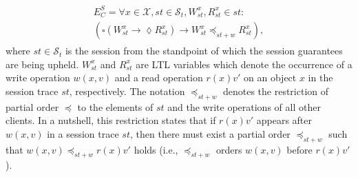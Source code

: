 \documentclass[journal, compsoc]{IEEEtran}
\begin{document}
	\begin{align}\label{eqn:RYW}
	\begin{split}
	E^S_C =  \forall x \in \mathcal{X}, \mathit{st} \in  \mathcal{S}_t, W_\mathit{st}^x, R_\mathit{st}^x \in \mathit{st}:
	\\ \left( \square \left( W_\mathit{st}^x \rightarrow \lozenge R_\mathit{st}^x \right)
	\rightarrow  W_\mathit{st}^x  \preccurlyeq_{\mathit{st}+w} R_\mathit{st}^x \right),
	\end{split}
	\end{align} where $\mathit{st}\in \mathcal{S}_t$ is the session from the standpoint of which the session guarantees are being upheld.
	$W_\mathit{st}^x$ and $R_\mathit{st}^x$ are LTL variables which denote the occurrence of a write operation $w(x,v)$ and a read operation $r(x){v'}$ on an object $x$ in the session trace $\mathit{st}$, respectively.
	The notation $\preccurlyeq_{\mathit{st}+w}$ denotes the restriction of partial order $\preccurlyeq$ to the elements of $\mathit{st}$ and the write operations of all other clients. %
	In a nutshell, this restriction states that if $r(x){v'}$ %
	appears after $w(x,v)$ in a session trace $\mathit{st}$, %
	then there must exist a partial order $\preccurlyeq_{\mathit{st}+w}$ such that $w(x,v) \preccurlyeq_{\mathit{st}+w} r(x){v'}$ holds (i.e., $\preccurlyeq_{\mathit{st}+w}$ orders $w(x,v)$ before $r(x){v'}$).
	
\end{document}

